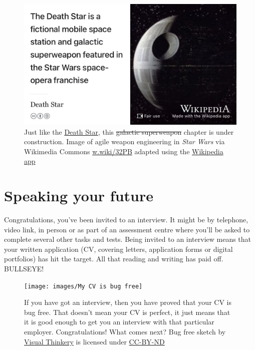 \documentclass[
]{book}
\begin{document}
\begin{figure}

{\centering \includegraphics[width=0.99\linewidth]{images/DeathStar2} 

}

\caption{Just like the \href{https://en.wikipedia.org/wiki/Death_Star}{Death Star}, this \sout{galactic superweapon} chapter is under construction. Image of agile weapon engineering in \emph{Star Wars} via Wikimedia Commons \href{https://w.wiki/32PB}{w.wiki/32PB} adapted using the \href{https://apps.apple.com/gb/app/wikipedia/id324715238}{Wikipedia app}}\label{fig:deathstar8-fig}
\end{figure}

\hypertarget{speaking}{%
\chapter{Speaking your future}\label{speaking}}

Congratulations, you've been invited to an interview. It might be by telephone, video link, in person or as part of an assessment centre where you'll be asked to complete several other tasks and tests. Being invited to an interview means that your written application (CV, covering letters, application forms or digital portfolios) has hit the target. All that reading and writing has paid off. BULLSEYE! 🎯

\begin{figure}

{\centering \texttt{[image: images/My CV is bug free]} 

}

\caption{If you have got an interview, then you have proved that your CV is bug free. That doesn't mean your CV is perfect, it just means that it is good enough to get you an interview with that particular employer. Congratulations! What comes next? Bug free sketch by \href{https://visualthinkery.com/}{Visual Thinkery} is licensed under \href{https://creativecommons.org/licenses/by-nd/4.0/}{CC-BY-ND}}\label{fig:bugfree-fig}
\end{figure}
\end{document}
